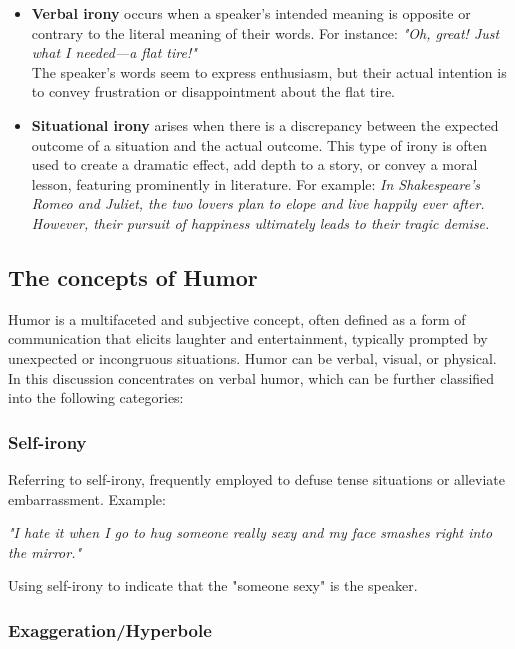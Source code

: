 \documentclass[a4paper]{article}
\begin{document}
\begin{itemize}
\item {\bf Verbal irony} occurs when a speaker's intended meaning is opposite or contrary to the literal meaning of their words. For instance: 
    \subitem \textit{"Oh, great! Just what I needed—a flat tire!"} 
    \\The speaker's words seem to express enthusiasm, but their actual intention is to convey frustration or disappointment about the flat tire.
\item {\bf Situational irony} arises when there is a discrepancy between the expected outcome of a situation and the actual outcome. This type of irony is often used to create a dramatic effect, add depth to a story, or convey a moral lesson, featuring prominently in literature. For example:
    \subitem \textit{In Shakespeare's Romeo and Juliet, the two lovers plan to elope and live happily ever after. However, their pursuit of happiness ultimately leads to their tragic demise.}
\end{itemize}

\subsection{The concepts of Humor}

Humor is a multifaceted and subjective concept, often defined as a form of communication that elicits laughter and entertainment, typically prompted by unexpected or incongruous situations. 
Humor can be verbal, visual, or physical. In this discussion concentrates on verbal humor, which can be further classified into the following categories:\cite{ref_concept1}


\subsubsection{\bf Self-irony}

Referring to self-irony, frequently employed to defuse tense situations or alleviate embarrassment. Example:  

\subitem\textit{"I hate it when I go to hug someone really sexy and my face smashes right into the mirror."}

Using self-irony to indicate that the "someone sexy" is the speaker.

\subsubsection{\bf Exaggeration/Hyperbole}
\end{document}
